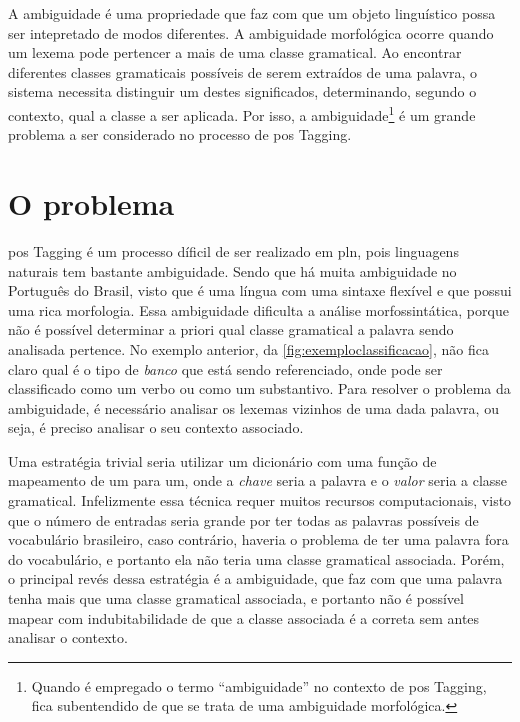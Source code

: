 A ambiguidade é uma propriedade que faz com que um objeto linguístico possa ser intepretado de modos diferentes. A ambiguidade morfológica ocorre quando um lexema pode pertencer a mais de uma classe gramatical. Ao encontrar diferentes classes gramaticais possíveis de serem extraídos de uma palavra, o sistema necessita distinguir um destes significados, determinando, segundo o contexto, qual a classe a ser aplicada. Por isso, a ambiguidade\footnote{Quando é empregado o termo ``ambiguidade'' no contexto de \ac{pos} Tagging, fica subentendido de que se trata de uma ambiguidade morfológica.} é um grande problema a ser considerado no processo de \ac{pos} Tagging. 




\section{O problema}\label{sec:oproblema}

\ac{pos} Tagging é um processo díficil de ser realizado em \ac{pln}, pois linguagens naturais tem bastante ambiguidade. Sendo que há muita ambiguidade no Português do Brasil, visto que é uma língua com uma sintaxe flexível e que possui uma rica morfologia. Essa ambiguidade dificulta a análise morfossintática, porque não é possível determinar a priori qual classe gramatical a palavra sendo analisada pertence. No exemplo anterior, da \autoref{fig:exemploclassificacao}, não fica claro qual é o tipo de \textit{banco} que está sendo referenciado, onde pode ser classificado como um verbo ou como um substantivo. Para resolver o problema da ambiguidade, é necessário analisar os lexemas vizinhos de uma dada palavra, ou seja, é preciso analisar o seu contexto associado.

Uma estratégia trivial seria utilizar um dicionário com uma função de mapeamento de um para um, onde a \textit{chave} seria a palavra e o \textit{valor} seria a classe gramatical. Infelizmente essa técnica requer muitos recursos computacionais, visto que o número de entradas seria grande por ter todas as palavras possíveis de vocabulário brasileiro, caso contrário, haveria o problema de ter uma palavra fora do vocabulário, e portanto ela não teria uma classe gramatical associada. Porém, o principal revés dessa estratégia é a ambiguidade, que faz com que uma palavra tenha mais que uma classe gramatical associada, e portanto não é possível mapear com indubitabilidade de que a classe associada é a correta sem antes analisar o contexto.

